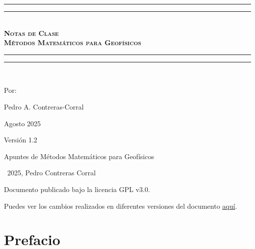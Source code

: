 \documentclass[letterpaper,12pt, twoside]{book}
\newlength{\drop}
\theoremstyle{definition}
\begin{document}
\newpage

\thispagestyle{empty}


\newpage

\begin{titlepage}
 \textheight
    \centering
    \vspace*{\baselineskip}
    \rule{\textwidth}{1.6pt}\vspace*{-\baselineskip}\vspace*{2pt}
    \rule{\textwidth}{0.4pt}\\[\baselineskip]
    {\scshape\bfseries\Huge{}\selectfont Notas de Clase} \\[0.2\baselineskip]
    {\scshape\bfseries\Huge{}\selectfont Métodos Matemáticos para Geofísicos} \\[0.2\baselineskip]
    \rule{\textwidth}{0.4pt}\vspace*{-\baselineskip}\vspace{3.2pt}
    \rule{\textwidth}{1.6pt}\\[\baselineskip]
    {\Large Por: \par}
{\large Pedro A. Contreras-Corral \par}
{\large Agosto 2025 \par}
\vfill
{\large Versión 1.2 \par}
\end{titlepage}

\mbox{} 
\vfill
Apuntes de Métodos Matemáticos para Geofísicos 

\textcopyright\ 2025, Pedro Contreras Corral %



Documento publicado bajo la licencia GPL v3.0.

Puedes ver los cambios realizados en diferentes versiones del documento \href{https://github.com/Pedroga-cc/MMG/blob/main/changelog.txt}{aquí}.


\vspace{1cm} 

\restoregeometry

\chapter*{Prefacio}
\end{document}
